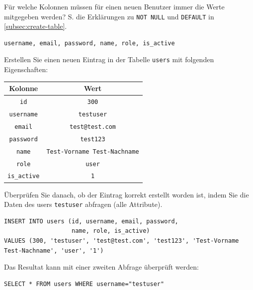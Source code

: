 \begin{myexercise}
\label{aufg:sql-insert}
  Für welche Kolonnen müssen für einen neuen Benutzer immer die Werte mitgegeben werden? S. die Erklärungen zu \lstinline|NOT NULL| und \lstinline|DEFAULT| in \cref{subsec:create-table}.
  \begin{myanswer}
    \begin{verbatim}
username, email, password, name, role, is_active
\end{verbatim}
  \end{myanswer}
\end{myexercise}
\begin{myexercise}\label{aufg:a-sql-insert}
  Erstellen Sie einen neuen Eintrag in der Tabelle \texttt{users} mit folgenden Eigenschaften:
  \begin{table}[H]
    \centering
    \begin{tabular}{c|c}
      \textbf{Kolonne}    & \textbf{Wert}                       \\\midrule
      \texttt{id}         & \texttt{300}                        \\
      \texttt{username}   & \texttt{testuser}                   \\
      \texttt{email}      & \texttt{test@test.com}              \\
      \texttt{password}   & \texttt{test123}                    \\
      \texttt{name}       & \texttt{Test-Vorname Test-Nachname} \\
      \texttt{role}       & \texttt{user}                       \\
      \texttt{is\_active} & \texttt{1}                          \\
    \end{tabular}
  \end{table}
  Überprüfen Sie danach, ob der Eintrag korrekt erstellt worden ist, indem Sie die Daten des users \texttt{testuser} abfragen (alle Attribute).
  \begin{myanswer}
    \begin{lstlisting}
INSERT INTO users (id, username, email, password, 
				   name, role, is_active) 
VALUES (300, 'testuser', 'test@test.com', 'test123', 'Test-Vorname Test-Nachname', 'user', '1')
\end{lstlisting}
Das Resultat kann mit einer zweiten Abfrage überprüft werden:
\begin{lstlisting}
SELECT * FROM users WHERE username="testuser"
\end{lstlisting}
  \end{myanswer}
\end{myexercise}

